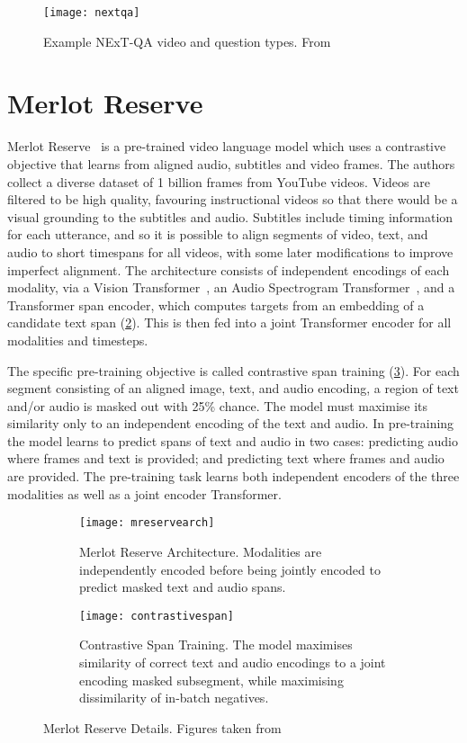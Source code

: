 \begin{figure}[tp]
	\centering
	\texttt{[image: nextqa]}
	\caption{Example NExT-QA video and question types.
		From~\citet{xiao2021nextqa}}
	\label{fig:nextqa}
\end{figure}


\section{Merlot Reserve}
\label{sec:mreserve}

Merlot Reserve~\citep{zellers2022mreserve} is a pre-trained video language
model which uses a contrastive objective that learns from aligned audio,
subtitles and video frames. The authors collect a diverse dataset of 1 billion
frames from YouTube videos. Videos are filtered to be high quality, favouring
instructional videos so that there would be a visual grounding to the subtitles
and audio. Subtitles include timing information for each utterance, and so it
is possible to align segments of video, text, and audio to short timespans for
all videos, with some later modifications to improve imperfect alignment. The
architecture consists of independent encodings of each modality, via a Vision
Transformer~\citep{dosovitskiy2021vit}, an Audio Spectrogram
Transformer~\citep{gong2021ast}, and a Transformer span encoder, which computes
targets from an embedding of a candidate text span (\cref{fig:mreservearch}).
This is then fed into a joint Transformer encoder for all modalities and
timesteps.

The specific pre-training objective is called contrastive span training
(\cref{fig:contrastivespan}). For each segment consisting of an aligned image,
text, and audio encoding, a region of text and/or audio is masked out with 25\%
chance. The model must maximise its similarity only to an independent encoding
of the text and audio. In pre-training the model learns to predict spans of
text and audio in two cases: predicting audio where frames and text is
provided; and predicting text where frames and audio are provided. The
pre-training task learns both independent encoders of the three modalities as
well as a joint encoder Transformer.

\begin{figure}[tp]
	\centering
	\begin{subfigure}[b]{0.45\textwidth}
		\centering
		\texttt{[image: mreservearch]}
		\caption{Merlot Reserve Architecture. Modalities are independently
		encoded before being jointly encoded to predict masked text and audio
		spans.}
		\label{fig:mreservearch}
	\end{subfigure}
	\hfill
	\begin{subfigure}[b]{0.45\textwidth}
		\centering
		\texttt{[image: contrastivespan]}
		\caption{Contrastive Span Training. The model maximises similarity of
		correct text and audio encodings to a joint encoding masked subsegment,
		while maximising dissimilarity of in-batch negatives.}
		\label{fig:contrastivespan}
	\end{subfigure}
	\caption{Merlot Reserve Details. Figures taken from~\citet{zellers2022mreserve}}
	\label{fig:mreserve}
\end{figure}

